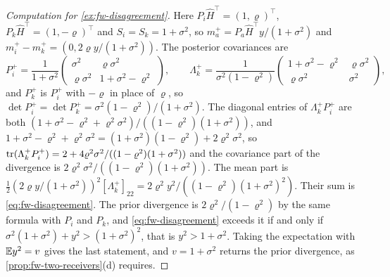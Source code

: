 \begin{proof}[Computation for \cref{ex:fw-disagreement}]
Here $P_i\hat H^\top=(1,\varrho)^\top$, $P_k\hat H^\top=(1,-\varrho)^\top$ and $S_i=S_k=1+\sigma^2$, so $m_a^+=P_a\hat H^\top y/(1+\sigma^2)$ and $m_i^+-m_k^+=(0,2\varrho y/(1+\sigma^2))$. The posterior covariances are
\[
P_i^+=\frac1{1+\sigma^2}\begin{pmatrix}\sigma^2&\varrho\sigma^2\\\varrho\sigma^2&1+\sigma^2-\varrho^2\end{pmatrix},\qquad\Lambda_k^+=\frac1{\sigma^2(1-\varrho^2)}\begin{pmatrix}1+\sigma^2-\varrho^2&\varrho\sigma^2\\\varrho\sigma^2&\sigma^2\end{pmatrix},
\]
and $P_k^+$ is $P_i^+$ with $-\varrho$ in place of $\varrho$, so $\det P_i^+=\det P_k^+=\sigma^2(1-\varrho^2)/(1+\sigma^2)$. The diagonal entries of $\Lambda_k^+P_i^+$ are both $(1+\sigma^2-\varrho^2+\varrho^2\sigma^2)/((1-\varrho^2)(1+\sigma^2))$, and $1+\sigma^2-\varrho^2+\varrho^2\sigma^2=(1+\sigma^2)(1-\varrho^2)+2\varrho^2\sigma^2$, so $\operatorname{tr}(\Lambda_k^+P_i^+)=2+4\varrho^2\sigma^2/((1-\varrho^2)(1+\sigma^2))$ and the covariance part of the divergence is $2\varrho^2\sigma^2/((1-\varrho^2)(1+\sigma^2))$. The mean part is $\tfrac12(2\varrho y/(1+\sigma^2))^2[\Lambda_k^+]_{22}=2\varrho^2y^2/((1-\varrho^2)(1+\sigma^2)^2)$. Their sum is \eqref{eq:fw-disagreement}. The prior divergence is $2\varrho^2/(1-\varrho^2)$ by the same formula with $P_i$ and $P_k$, and \eqref{eq:fw-disagreement} exceeds it if and only if $\sigma^2(1+\sigma^2)+y^2>(1+\sigma^2)^2$, that is $y^2>1+\sigma^2$. Taking the expectation with $\mathbb{E} y^2=v$ gives the last statement, and $v=1+\sigma^2$ returns the prior divergence, as \cref{prop:fw-two-receivers}(d) requires.
\end{proof}

